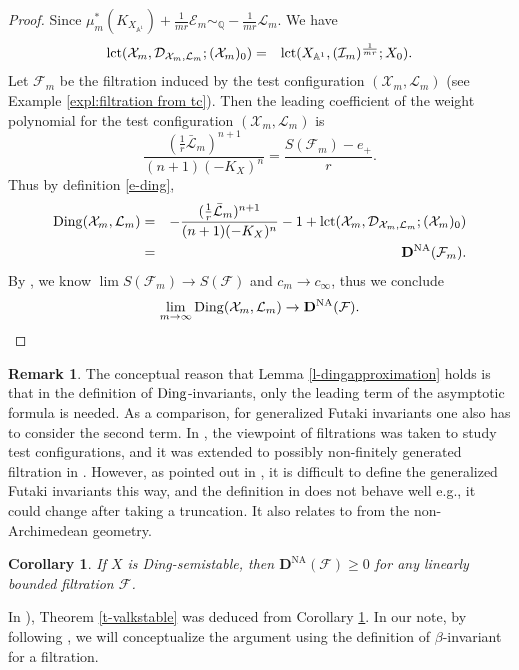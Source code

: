 \documentclass[12pt,reqno]{amsart}%
\newcommand{\bA}{{\mathbb{A} }}
\newcommand{\cX}{{\mathcal{X}}}
\newcommand{\cL}{{\mathcal{L}}}
\newcommand{\cF}{\mathcal{F}}
\newcommand{\DNA}{\mathbf{D}^{\mathrm{NA}}}
\newcommand{\mult}{{\rm mult}}
\newtheorem{cor}[thm]{Corollary}
\theoremstyle{definition}
\newtheorem{rem}[thm]{Remark}
\theoremstyle{remark}
\newcommand{\Ding}{{\rm Ding}}
\newcommand{\cD}{{\mathcal{D}}}
\newcommand{\lct}{{\rm lct}}
\newcommand{\cI}{\mathcal{I}}
\begin{document}
\begin{proof}Since $\mu_m^*(K_{X_{\bA^1}})+\frac{1}{mr}{\mathcal E}_m\sim_{\mathbb Q}-\frac{1}{mr}\cL_m$. We have 
\begin{eqnarray*}
\lct(\cX_m, \cD_{\cX_m,\cL_m};(\cX_m)_0)&=&  \lct(X_{\bA^1},(\cI_m)^\frac{1}{mr};X_0).
\end{eqnarray*}
Let $\cF_m$ be the filtration induced by the test configuration $(\cX_m, \cL_m)$ (see Example \ref{expl:filtration from tc}). 
Then the leading coefficient of the weight polynomial for the test configuration $(\cX_m,\cL_m)$ is 
$$\frac{ (\frac{1}{r}\bar{\cL}_m)^{n+1}  }{(n+1)(-K_X)^n}=\frac{S(\cF_m)-e_+}{r}.$$ 
Thus by definition \eqref{e-ding},
\begin{eqnarray*}
 \Ding(\cX_m,{\cL_m})&=& -\frac{ (\frac{1}{r}\bar{\cL}_m)^{n+1}  }{(n+1)(-K_X)^n}-1+\lct(\cX_m, \cD_{\cX_m,\cL_m};(\cX_m)_0)\\
  &=& \DNA(\cF_m). 
\end{eqnarray*}
By \cite[Lem. 4.7]{Fuj18}, we know $\lim S(\cF_m)\to S(\cF)$ and  $c_m\to c_{\infty}$, thus we conclude 
$$\lim_{m\to \infty}\Ding(\cX_m, \cL_m)\to \DNA(\cF).$$ 
\end{proof}
\begin{rem}\label{r-futakifiltration}
The conceptual reason that Lemma \ref{l-dingapproximation} holds is that in the definition of $\Ding$-invariants, only the leading term of the asymptotic formula is needed. As a comparison, for generalized Futaki invariants one also has to consider the second term. In \cite{Nys12}, the viewpoint of filtrations was taken to study test configurations, and it was extended to possibly non-finitely generated filtration in \cite{Sze15}. However, as pointed out in \cite{Nys12}, it is difficult to define the generalized Futaki invariants this way, and the definition in \cite[Def. 4]{Sze15} does not behave well e.g., it could change after taking a truncation. It also relates to \cite[Conj. 2.5]{BoJ18} from the non-Archimedean geometry.
\end{rem}
\begin{cor}\label{c-dingfiltration}
If $X$ is Ding-semistable, then $\DNA(\cF)\ge 0$ for any linearly bounded filtration $\cF$. 
\end{cor}
In  \cite{Fuj19b, Li17}),  Theorem \ref{t-valkstable} was deduced from Corollary \ref{c-dingfiltration}.  In our note,  by following \cite{XZ19}, we will conceptualize the argument using the definition of $\beta$-invariant for a filtration.
\end{document}

